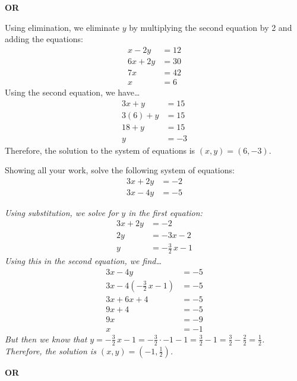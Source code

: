 \documentclass[12pt,letterpaper]{exam}
\begin{document}
\begin{questions}
{\begin{center} {\bfseries OR} \end{center}

Using elimination, we eliminate $y$ by multiplying the second equation by 2 and adding the equations:
	\[
	\begin{aligned}
	x - 2y&= 12 \\
	6x + 2y&= 30 \\ \hline
	7x&= 42 \\
	x&= 6
	\end{aligned}
	\] 
Using the second equation, we have\dots
	\[
	\begin{aligned}
	3x + y&= 15 \\
	3(6) + y&= 15 \\
	18 + y&= 15 \\
	y&= -3
	\end{aligned}
	\] 
Therefore, the solution to the system of equations is $(x, y)= (6, -3)$. 
}



\newpage
\question[7] Showing all your work, solve the following system of equations:
	\[
	\begin{aligned}
	3x + 2y&= -2 \\
	3x - 4y&= -5
	\end{aligned}
	\] \pspace

{\itshape Using substitution, we solve for $y$ in the first equation:
	\[
	\begin{aligned}
	3x + 2y&= -2 \\
	2y&= -3x - 2 \\
	y&= -\frac{3}{2}\,x - 1
	\end{aligned}
	\] 
Using this in the second equation, we find\dots
	\[
	\begin{aligned}
	3x - 4y&= -5 \\
	3x - 4 \left( -\frac{3}{2}\,x - 1 \right)&= -5 \\
	3x + 6x + 4&= -5 \\
	9x + 4&= -5 \\
	9x&= -9 \\
	x&= -1
	\end{aligned}
	\] 
But then we know that $y= -\frac{3}{2}\,x - 1= -\frac{3}{2} \cdot -1 - 1= \frac{3}{2} - 1= \frac{3}{2} - \frac{2}{2}= \frac{1}{2}$. Therefore, the solution is $(x, y)= (-1, \frac{1}{2})$. 
	
\begin{center} {\bfseries OR} \end{center}

}
\end{questions}
\end{document}
